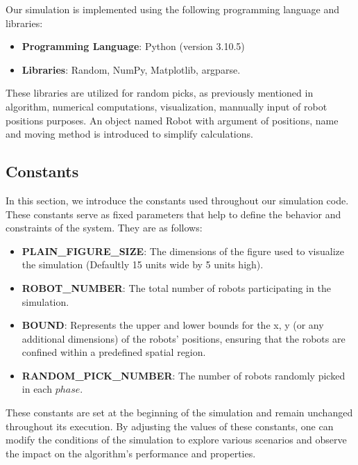 \documentclass[]{report}
\begin{document}
Our simulation is implemented using the following programming language and libraries:

\begin{itemize}
\item \textbf{Programming Language}: Python (version 3.10.5)
\item \textbf{Libraries}: Random, NumPy, Matplotlib, argparse.
\end{itemize}

These libraries are utilized for random picks, as previously mentioned in algorithm, numerical computations, visualization, mannually input of robot positions purposes. An object named Robot with argument of positions, name and moving method is introduced to simplify calculations.
\subsection{Constants}

In this section, we introduce the constants used throughout our simulation code. These constants serve as fixed parameters that help to define the behavior and constraints of the system. They are as follows:

\begin{itemize}
\item \textbf{PLAIN\_FIGURE\_SIZE}: The dimensions of the figure used to visualize the simulation (Defaultly 15 units wide by 5 units high).
\item \textbf{ROBOT\_NUMBER}: The total number of robots participating in the simulation.
\item \textbf{BOUND}: Represents the upper and lower bounds for the x, y (or any additional dimensions) of the robots' positions, ensuring that the robots are confined within a predefined spatial region.
\item \textbf{RANDOM\_PICK\_NUMBER}: The number of robots randomly picked in each \(phase\).
\end{itemize}

These constants are set at the beginning of the simulation and remain unchanged throughout its execution. By adjusting the values of these constants, one can modify the conditions of the simulation to explore various scenarios and observe the impact on the algorithm's performance and properties.
\end{document}
